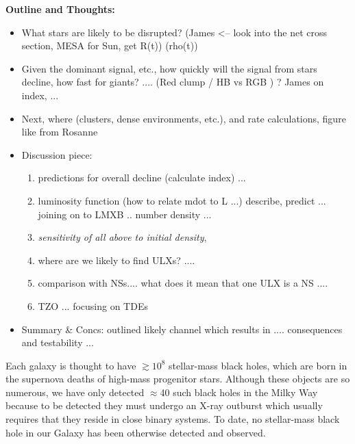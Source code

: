 \bf{Outline and Thoughts:}\\
\begin{itemize}
\item What stars are likely to be disrupted?  (James <-- look into the net cross section, MESA for Sun, get R(t)) (rho(t)) \\
\item Given the dominant signal, etc., how quickly will the signal from stars decline, how fast for giants? .... (Red clump / HB vs RGB ) ?  James on index, ... \\ 
\item Next, where (clusters, dense environments, etc.), and rate calculations, figure like from Rosanne \\
\item Discussion piece: 
\begin{enumerate}
    \item predictions for overall decline (calculate index) ... 
    \item luminosity function (how to relate mdot to L ...) describe, predict  ... joining on to LMXB .. number density ... 
    \item {\it sensitivity of all above to initial density},  
    \item where are we likely to find ULXs? .... 
    \item comparison with NSs.... what does it mean that one ULX is a NS .... 
    \item TZO ... focusing on TDEs 
    \end{enumerate}
    
\item Summary & Concs: outlined likely channel which results in .... consequences and testability ... 
\end{itemize}






Each galaxy is thought to have $\gtrsim 10^8$ stellar-mass black
holes, which are born in the supernova deaths of high-mass progenitor
stars.  Although these objects are so numerous, we have only detected
$\approx$40 such black holes in the Milky Way because to be detected
they must undergo an X-ray outburst which usually requires that they
reside in close binary systems.  To date, no stellar-mass black hole
in our Galaxy has been otherwise detected and observed.


